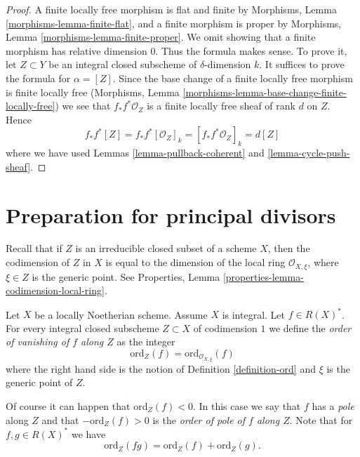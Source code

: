 \begin{proof}
A finite locally free morphism is flat and finite by
Morphisms, Lemma \ref{morphisms-lemma-finite-flat},
and a finite morphism is proper
by Morphisms, Lemma \ref{morphisms-lemma-finite-proper}.
We omit showing that a finite
morphism has relative dimension $0$. Thus the formula makes sense.
To prove it, let $Z \subset Y$ be an integral closed subscheme
of $\delta$-dimension $k$. It suffices to prove the formula
for $\alpha = [Z]$. Since the base change of a finite locally free
morphism is finite locally free
(Morphisms, Lemma \ref{morphisms-lemma-base-change-finite-locally-free})
we see that $f_*f^*\mathcal{O}_Z$ is a finite locally free sheaf of
rank $d$ on $Z$. Hence
$$
f_*f^*[Z] = f_*f^*[\mathcal{O}_Z]_k =
[f_*f^*\mathcal{O}_Z]_k = d[Z]
$$
where we have used Lemmas \ref{lemma-pullback-coherent} and
\ref{lemma-cycle-push-sheaf}.
\end{proof}








\section{Preparation for principal divisors}
\label{section-preparation-principal-divisors}

\noindent
Recall that if $Z$ is an irreducible closed subset of a scheme $X$,
then the codimension of $Z$ in $X$ is equal to the dimension
of the local ring $\mathcal{O}_{X, \xi}$, where $\xi \in Z$
is the generic point. See
Properties, Lemma \ref{properties-lemma-codimension-local-ring}.

\begin{definition}
\label{definition-order-vanishing}
Let $X$ be a locally Noetherian scheme. Assume $X$ is integral.
Let $f \in R(X)^*$. For every integral closed subscheme
$Z \subset X$ of codimension $1$ we define
the {\it order of vanishing of $f$ along $Z$} as the integer
$$
\text{ord}_Z(f) = \text{ord}_{\mathcal{O}_{X, \xi}}(f)
$$
where the right hand side is the notion of
Definition \ref{definition-ord} and $\xi$ is the generic point of $Z$.
\end{definition}

\noindent
Of course it can happen that $\text{ord}_Z(f) < 0$.
In this case we say that $f$ has a {\it pole} along $Z$
and that $-\text{ord}_Z(f) > 0$ is the {\it order of pole of
$f$ along $Z$}. Note that for $f, g \in R(X)^*$ we have
$$
\text{ord}_Z(fg) = \text{ord}_Z(f) + \text{ord}_Z(g).
$$

